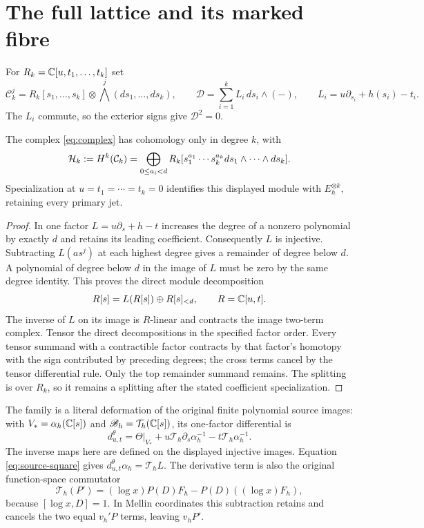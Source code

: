 \section{The full lattice and its marked fibre}

For $R_k=\mathbb C[u,t_1,\ldots,t_k]$ set
\begin{equation}
 \mathcal C_k^j=R_k[s_1,\ldots,s_k]\otimes
                  \bigwedge^j(ds_1,\ldots,ds_k),\qquad
 \mathcal D=\sum_{i=1}^k L_i\,ds_i\wedge(-),\qquad
 L_i=u\partial_{s_i}+h(s_i)-t_i.
 \label{eq:complex}
\end{equation}
The $L_i$ commute, so the exterior signs give $\mathcal D^2=0$.

\begin{proposition}
The complex \eqref{eq:complex} has cohomology only in degree $k$, with
\begin{equation}
 \mathcal H_k:=H^k(\mathcal C_k)
   =\bigoplus_{0\le a_i<d}R_k
       [s_1^{a_1}\cdots s_k^{a_k}ds_1\wedge\cdots\wedge ds_k].
 \label{eq:lattice}
\end{equation}
Specialization at $u=t_1=\cdots=t_k=0$ identifies this displayed
module with $E_h^{\otimes k}$, retaining every primary jet.
\end{proposition}
\begin{proof}
In one factor $L=u\partial_s+h-t$ increases the degree of a nonzero
polynomial by exactly $d$ and retains its leading coefficient.
Consequently $L$ is injective.  Subtracting $L(as^j)$ at each highest
degree gives a remainder of degree below $d$.  A polynomial of degree
below $d$ in the image of $L$ must be zero by the same degree identity.
This proves the direct module decomposition
\[
 R[s]=L(R[s])\oplus R[s]_{<d},\qquad R=\mathbb C[u,t].
\]
The inverse of $L$ on its image is $R$-linear and contracts the image
two-term complex.  Tensor the direct decompositions in the specified
factor order.  Every tensor summand with a contractible factor contracts
by that factor's homotopy with the sign contributed by preceding degrees;
the cross terms cancel by the tensor differential rule.  Only the top
remainder summand remains.  The splitting is over $R_k$, so it remains a
splitting after the stated coefficient specialization.
\end{proof}

The family is a literal deformation of the original finite polynomial
source images: with $V_* =\alpha_h(\mathbb C[s])$ and
$\mathscr B_h=\mathcal T_h(\mathbb C[s])$, its one-factor differential is
\begin{equation}
 d^\theta_{u,t}=\Theta|_{V_*}
       +u\mathcal T_h\partial_s\alpha_h^{-1}
       -t\mathcal T_h\alpha_h^{-1}.
\end{equation}
The inverse maps here are defined on the displayed injective images.
Equation \eqref{eq:source-square} gives
$d^\theta_{u,t}\alpha_h=\mathcal T_hL$.
The derivative term is also the original function-space commutator
\[
 \mathcal T_h(P')=(\log x)P(D)F_h-P(D)((\log x)F_h),
\]
because $[\log x,D]=1$.  In Mellin coordinates this subtraction
retains and cancels the two equal $v_h'P$ terms, leaving $v_hP'$.

